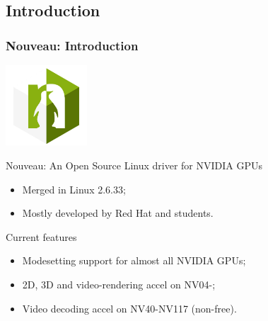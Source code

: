 \documentclass[11pt,english,compress]{beamer}
\begin{document}
\subsection{Introduction}
\begin{frame}
	\frametitle{Nouveau: Introduction}

	\vspace{-0.3cm}
	\begin{center}
		\includegraphics[height=3cm]{imgs/nouveau_logo.jpg}
	\end{center}
	\vspace{-0.3cm}

	\begin{block}{Nouveau: An Open Source Linux driver for NVIDIA GPUs}
		\begin{itemize}
			\item Merged in Linux 2.6.33; %
			\item Mostly developed by Red Hat and students.
		\end{itemize}
	\end{block}

	\begin{block}{Current features}
		\begin{itemize}
			\item Modesetting support for almost all NVIDIA GPUs;
			\item 2D, 3D and video-rendering accel on NV04-;
			\item Video decoding accel on NV40-NV117 (non-free).
		\end{itemize}
	\end{block}
\end{frame}
\end{document}
